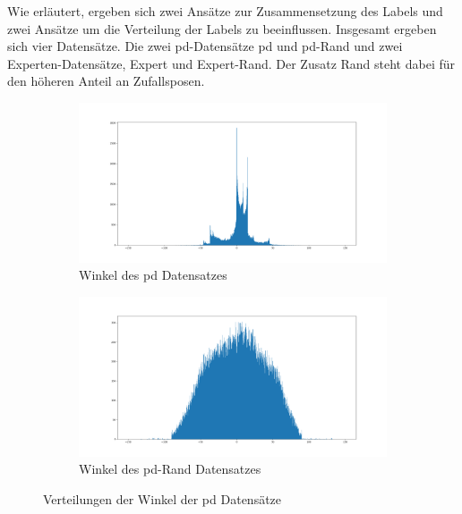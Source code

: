 Wie erläutert, ergeben sich zwei Ansätze zur Zusammensetzung des Labels und zwei Ansätze um die Verteilung der Labels zu beeinflussen. Insgesamt ergeben sich vier Datensätze. Die zwei \acs{pd}-Datensätze \glqq \acs{pd}\grqq{} und \glqq \acs{pd}-Rand\grqq{} und zwei Experten-Datensätze, \glqq Expert\grqq{} und \glqq Expert-Rand\grqq . Der Zusatz \glqq Rand\grqq{} steht dabei für den höheren Anteil an Zufallsposen.
\begin{figure}[H]
	\centering
	\begin{subfigure}{0.5\textwidth}
		\centering
		\includegraphics[width=\linewidth]{kapitel4/images/plots/pd-angles.png}
		\caption{Winkel des \acs{pd} Datensatzes}
		\label{pd-drive-angles}
	\end{subfigure}%
	\begin{subfigure}{0.5\textwidth}
		\centering
		\includegraphics[width=\linewidth]{kapitel4/images/plots/pd-rand-angles.png}
		\caption{Winkel des \acs{pd}-Rand Datensatzes}
		\label{pd-rand-angles}
	\end{subfigure}
	\caption{Verteilungen der Winkel der \acs{pd} Datensätze}
	\label{pd-angles}
\end{figure}


